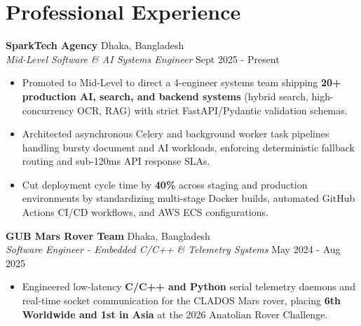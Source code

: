 \documentclass[9.5pt,a4paper]{article}
\begin{document}
\section*{Professional Experience}
\noindent
\textbf{SparkTech Agency} \hfill Dhaka, Bangladesh\\
\textit{Mid-Level Software & AI Systems Engineer} \hfill Sept 2025 - Present
\begin{itemize}
    \item Promoted to Mid-Level to direct a 4-engineer systems team shipping \textbf{20+ production AI, search, and backend systems} (hybrid search, high-concurrency OCR, RAG) with strict FastAPI/Pydantic validation schemas.
    \item Architected asynchronous Celery and background worker task pipelines handling bursty document and AI workloads, enforcing deterministic fallback routing and sub-120ms API response SLAs.
    \item Cut deployment cycle time by \textbf{40\%} across staging and production environments by standardizing multi-stage Docker builds, automated GitHub Actions CI/CD workflows, and AWS ECS configurations.
\end{itemize}
\vspace{0.6pt}
\noindent
\textbf{GUB Mars Rover Team} \hfill Dhaka, Bangladesh\\
\textit{Software Engineer - Embedded C/C++ & Telemetry Systems} \hfill May 2024 - Aug 2025
\begin{itemize}
    \item Engineered low-latency \textbf{C/C++ and Python} serial telemetry daemons and real-time socket communication for the CLADOS Mars rover, placing \textbf{6th Worldwide and 1st in Asia} at the 2026 Anatolian Rover Challenge.
\end{itemize}
\vspace{0.6pt}
\end{document}
